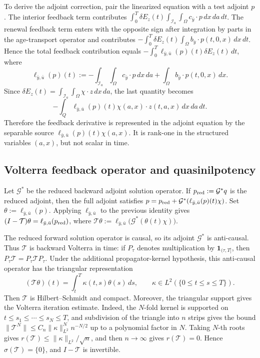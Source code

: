 \documentclass[pdflatex,sn-mathphys-num]{sn-jnl}
\theoremstyle{plain}
\theoremstyle{definition}
\theoremstyle{remark}
\begin{document}
To derive the adjoint correction, pair the linearized equation with a test
adjoint \(p\). The interior feedback term contributes
\(\int_0^T\delta E_z(t)\int_{\mathcal I_a}\int_\Omega c_{\bar y}\cdot p\,dx\,da\,dt\).
The renewal feedback term enters with the opposite sign after integration by
parts in the age-transport operator and contributes
\(-\int_0^T\delta E_z(t)\int_\Omega b_{\bar y}\cdot p(t,0,x)\,dx\,dt\). Hence
the total feedback contribution equals
$\displaystyle -\int_0^T\ell_{\bar y,\bar u}(p)(t)\delta E_z(t)\,dt$,
where
\[
\ell_{\bar y,\bar u}(p)(t):=
-\int_{\mathcal I_a}\int_\Omega c_{\bar y}\cdot p\,dx\,da
+\int_\Omega b_{\bar y}\cdot p(t,0,x)\,dx .
\]
Since \(\delta E_z(t)=\int_{\mathcal I_a}\int_\Omega\chi\cdot z\,dx\,da\), the last
quantity becomes
\[
-\int_Q \ell_{\bar y,\bar u}(p)(t)\chi(a,x)\cdot z(t,a,x)\,dx\,da\,dt .
\]
Therefore the feedback derivative is represented in the adjoint equation by
the separable source \(\ell_{\bar y,\bar u}(p)(t)\chi(a,x)\). It is rank-one
in the structured variables \((a,x)\), but not scalar in time.

\subsection{Volterra feedback operator and quasinilpotency}
\label{app:volterra-quasinilpotency}

Let \(\mathcal G^*\) be the reduced backward adjoint solution operator. If
\(p_{\rm red}:=\mathcal G^*q\) is the reduced adjoint, then the full adjoint
satisfies \(p=p_{\rm red}+\mathcal G^*(\ell_{\bar y,\bar u}(p)(t)\chi)\).
Set \(\theta:=\ell_{\bar y,\bar u}(p)\). Applying \(\ell_{\bar y,\bar u}\) to
the previous identity gives \((I-\mathcal T)\theta
=\ell_{\bar y,\bar u}(p_{\rm red})\), where
$\displaystyle \mathcal T\theta:=\ell_{\bar y,\bar u}\big(\mathcal G^*(\theta(t)\chi)\big)$.

The reduced forward solution operator is causal, so its adjoint
\(\mathcal G^*\) is anti-causal. Thus \(\mathcal T\) is backward Volterra in
time: if \(P_\tau\) denotes multiplication by \(\mathbf 1_{(\tau,T]}\), then
\(P_\tau\mathcal T=P_\tau\mathcal TP_\tau\). Under the additional
propagator-kernel hypothesis, this anti-causal operator has the triangular
representation
\[
(\mathcal T\theta)(t)=\int_t^T\kappa(t,s)\theta(s)\,ds,
\qquad
\kappa\in L^2(\{0\le t\le s\le T\}).
\]
Then \(\mathcal T\) is Hilbert--Schmidt and compact. Moreover, the triangular
support gives the Volterra iteration estimate. Indeed, the \(N\)-fold kernel
is supported on \(t\le s_1\le\cdots\le s_N\le T\), and subdivision of the
triangle into \(n\) strips gives the bound
\(\|\mathcal T^N\|\le C_n\|\kappa\|_{L^2}^N n^{-N/2}\) up to a polynomial
factor in \(N\). Taking \(N\)-th roots gives
\(r(\mathcal T)\le \|\kappa\|_{L^2}/\sqrt n\), and then \(n\to\infty\) gives
\(r(\mathcal T)=0\). Hence \(\sigma(\mathcal T)=\{0\}\), and \(I-\mathcal T\)
is invertible.
\end{document}
